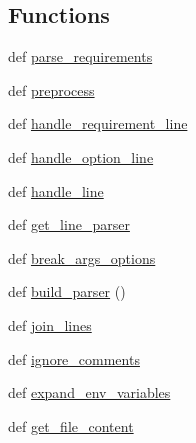 \subsection*{Functions}
\begin{DoxyCompactItemize}
\item 
def \hyperlink{namespacepip_1_1__internal_1_1req_1_1req__file_ae75fb3984a268f4e8e14ade2cd0bf6d1}{parse\+\_\+requirements}
\item 
def \hyperlink{namespacepip_1_1__internal_1_1req_1_1req__file_aebd3191825c4c9d3042b9c6778ec5d1f}{preprocess}
\item 
def \hyperlink{namespacepip_1_1__internal_1_1req_1_1req__file_a7980f82f020796707ae7466afc24f456}{handle\+\_\+requirement\+\_\+line}
\item 
def \hyperlink{namespacepip_1_1__internal_1_1req_1_1req__file_a87bfbae1f53517b872164ed5916e081d}{handle\+\_\+option\+\_\+line}
\item 
def \hyperlink{namespacepip_1_1__internal_1_1req_1_1req__file_adbd8c3946acf7b21052c8dc685707f4d}{handle\+\_\+line}
\item 
def \hyperlink{namespacepip_1_1__internal_1_1req_1_1req__file_a573b73e2ea29d4e830539058d60ae094}{get\+\_\+line\+\_\+parser}
\item 
def \hyperlink{namespacepip_1_1__internal_1_1req_1_1req__file_a5fae6faa1552fba8b831c5f710fc3e14}{break\+\_\+args\+\_\+options}
\item 
def \hyperlink{namespacepip_1_1__internal_1_1req_1_1req__file_ad877f09761f42a82cda8fe3630689b20}{build\+\_\+parser} ()
\item 
def \hyperlink{namespacepip_1_1__internal_1_1req_1_1req__file_a1a605d68cba54317b96bd2a8fcb4a55f}{join\+\_\+lines}
\item 
def \hyperlink{namespacepip_1_1__internal_1_1req_1_1req__file_afeff1af09a3aef38c03d414d80c231db}{ignore\+\_\+comments}
\item 
def \hyperlink{namespacepip_1_1__internal_1_1req_1_1req__file_a79e524481a71cf67e4d3b0631cb15df0}{expand\+\_\+env\+\_\+variables}
\item 
def \hyperlink{namespacepip_1_1__internal_1_1req_1_1req__file_ac016d7598375b47d3df58be48833e62e}{get\+\_\+file\+\_\+content}
\end{DoxyCompactItemize}
